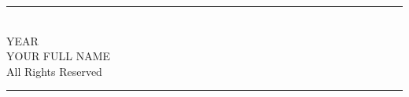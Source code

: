 \vspace*{2cm}

\begin{center}
\rule{\textwidth}{0.4pt} \\[0.5em]
YEAR \\
YOUR FULL NAME \\
All Rights Reserved \\[0.5em]
\rule{\textwidth}{0.4pt}
\end{center}

\vfill
